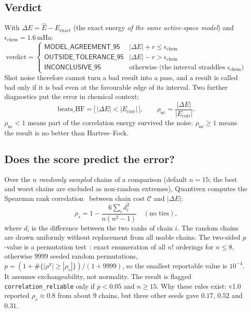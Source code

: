 \documentclass[10pt,a4paper]{article}
\newcommand{\mHa}{\,\mathrm{mHa}}
\newcommand{\code}[1]{\texttt{\small #1}}
\begin{document}
\subsection{Verdict}
With $\Delta E=\widehat E-E_{\mathrm{exact}}$ (the exact energy \emph{of the same active-space model}) and $\epsilon_{\mathrm{chem}}=1.6\mHa$:
\begin{equation}
\text{verdict}=\begin{cases}
\textsf{MODEL\_AGREEMENT\_95} & |\Delta E|+r\le\epsilon_{\mathrm{chem}}\\
\textsf{OUTSIDE\_TOLERANCE\_95} & |\Delta E|-r>\epsilon_{\mathrm{chem}}\\
\textsf{INCONCLUSIVE\_95} & \text{otherwise (the interval straddles }\epsilon_{\mathrm{chem}})
\end{cases}
\end{equation}
Shot noise therefore cannot turn a bad result into a pass, and a result is called bad only if it is bad even at the favourable edge of its interval. Two further diagnostics put the error in chemical context:
\begin{equation}
\text{beats\_HF}=\bigl[\,|\Delta E|<|E_{\mathrm{corr}}|\,\bigr],\qquad
\rho_{\mathrm{nc}}=\frac{|\Delta E|}{|E_{\mathrm{corr}}|}.
\end{equation}
$\rho_{\mathrm{nc}}<1$ means part of the correlation energy survived the noise. $\rho_{\mathrm{nc}}\ge1$ means the result is no better than Hartree--Fock.

\subsection{Does the score predict the error?}
Over the $n$ \emph{randomly sampled} chains of a comparison (default $n=15$; the best and worst chains are excluded as non-random extremes), Quantivex computes the Spearman rank correlation~\cite{Spearman1904} between chain cost $\mathcal C$ and $|\Delta E|$:
\begin{equation}
\rho_s = 1-\frac{6\sum_i d_i^2}{n(n^2-1)}\quad(\text{no ties}),
\end{equation}
where $d_i$ is the difference between the two ranks of chain $i$. The random chains are drawn uniformly without replacement from all usable chains. The two-sided $p$-value is a permutation test~\cite{Good2005}: exact enumeration of all $n!$ orderings for $n\le8$, otherwise 9999 seeded random permutations, $p=(1+\#\{|\rho^{\pi}|\ge|\rho_s|\})/(1+9999)$, so the smallest reportable value is $10^{-4}$. It assumes exchangeability, not normality. The result is flagged \code{correlation\_reliable} only if $p<0.05$ and $n\ge15$. Why these rules exist: v1.0 reported $\rho_s\approx0.8$ from about 9 chains, but three other seeds gave $0.17$, $0.52$ and $0.31$.
\end{document}
